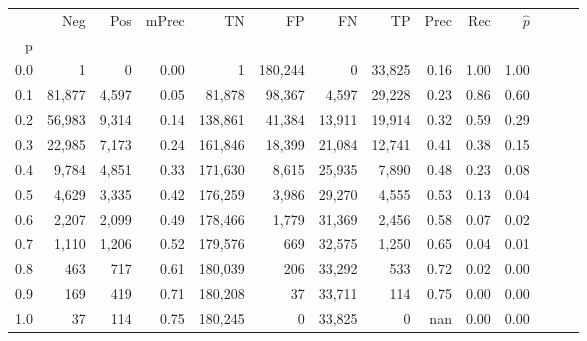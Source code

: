 \begin{tabular}{rrrrrrrrrrrrrr}
\toprule
{} &     Neg &    Pos & mPrec &       TN &       FP &      FN &      TP &  Prec &   Rec & $\hat{p}$ \\
p   &         &        &       &          &          &         &         &       &       &           \\
\midrule
0.0 &       1 &      0 &  0.00 &        1 &  180,244 &       0 &  33,825 &  0.16 &  1.00 &      1.00 \\
0.1 &  81,877 &  4,597 &  0.05 &   81,878 &   98,367 &   4,597 &  29,228 &  0.23 &  0.86 &      0.60 \\
0.2 &  56,983 &  9,314 &  0.14 &  138,861 &   41,384 &  13,911 &  19,914 &  0.32 &  0.59 &      0.29 \\
0.3 &  22,985 &  7,173 &  0.24 &  161,846 &   18,399 &  21,084 &  12,741 &  0.41 &  0.38 &      0.15 \\
0.4 &   9,784 &  4,851 &  0.33 &  171,630 &    8,615 &  25,935 &   7,890 &  0.48 &  0.23 &      0.08 \\
0.5 &   4,629 &  3,335 &  0.42 &  176,259 &    3,986 &  29,270 &   4,555 &  0.53 &  0.13 &      0.04 \\
0.6 &   2,207 &  2,099 &  0.49 &  178,466 &    1,779 &  31,369 &   2,456 &  0.58 &  0.07 &      0.02 \\
0.7 &   1,110 &  1,206 &  0.52 &  179,576 &      669 &  32,575 &   1,250 &  0.65 &  0.04 &      0.01 \\
0.8 &     463 &    717 &  0.61 &  180,039 &      206 &  33,292 &     533 &  0.72 &  0.02 &      0.00 \\
0.9 &     169 &    419 &  0.71 &  180,208 &       37 &  33,711 &     114 &  0.75 &  0.00 &      0.00 \\
1.0 &      37 &    114 &  0.75 &  180,245 &        0 &  33,825 &       0 &   nan &  0.00 &      0.00 \\
\bottomrule
\end{tabular}
